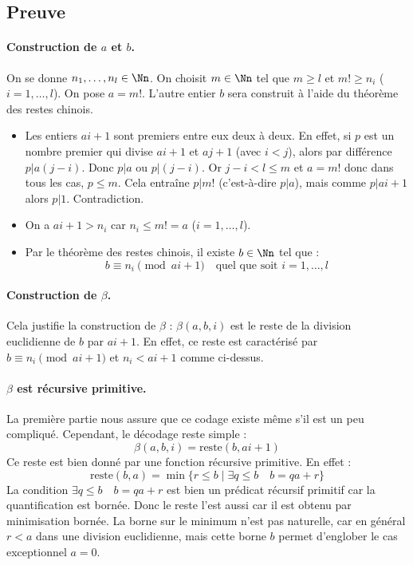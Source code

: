 \documentclass[11pt,class=report,crop=false]{standalone}
\begin{document}
\subsection{Preuve} 

    \paragraph{Construction de $a$ et $b$.}
    On se donne $n_1, \dots, n_l \in \Nn$.
    On choisit $m \in \Nn$ tel que $m \ge l$ et $m! \ge n_i$ ($i=1,\dots,l$).
    On pose $a = m!$. L'autre entier $b$ sera construit à l'aide du théorème des restes chinois.

    \begin{itemize}
        \item Les entiers $a i + 1$ sont premiers entre eux deux à deux.
    En effet, si $p$ est un nombre premier qui divise $ai+1$ et $aj+1$ (avec $i < j$), alors par différence $p | a(j-i)$.
    Donc $p | a$ ou $p | (j-i)$. Or $j-i < l \le m$ et $a = m!$ donc dans tous les cas, $p \le m$. Cela entraîne $p | m!$ (c'est-à-dire $p | a$), mais comme $p | ai+1$ alors $p|1$. Contradiction.

        \item On a $a i + 1 > n_i$ car $n_i \le m! = a$ ($i=1,\dots,l$).

        \item Par le théorème des restes chinois, il existe $b \in \Nn$ tel que :
    \[ b \equiv n_i \pmod{ai+1} \quad \text{quel que soit } i=1, \dots, l \]
    \end{itemize}

    \paragraph{Construction de $\beta$.}
    Cela justifie la construction de $\beta$ : $\beta(a,b,i)$ est le reste de la division euclidienne de $b$ par $a i + 1$.
    En effet, ce reste est caractérisé par $b \equiv n_i \pmod{ai+1}$ et $n_i < ai+1$ comme ci-dessus.

    \paragraph{$\beta$ est récursive primitive.}
    La première partie nous assure que ce codage existe même s'il est un peu compliqué. Cependant, le décodage reste simple :
    \[ \beta(a,b,i) = \text{reste}(b, ai+1) \]
    Ce reste est bien donné par une fonction récursive primitive. En effet :
    \[ \text{reste}(b,a) = \min \{ r \le b \mid \exists q \le b \quad b = qa+r \} \]
    La condition \og{}$\exists q \le b \quad b = qa+r$\fg{} est bien un prédicat récursif primitif car la quantification est bornée. Donc le reste l'est aussi car il est obtenu par minimisation bornée. La borne sur le minimum n'est pas naturelle, car en général $r < a$ dans une division euclidienne, mais cette borne $b$ permet d'englober le cas exceptionnel $a=0$.
\end{document}
